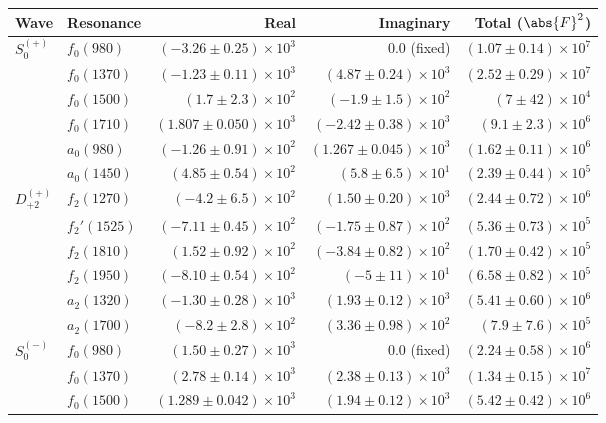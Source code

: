 \begin{table}[ht]
    \begin{center}
        \begin{tabular}{llrrr}\toprule
        Wave & Resonance & Real & Imaginary & Total ($\abs{F}^2$) \\\midrule
$S_{0}^{(+)}$ & $f_{0}(980)$ & $(-3.26 \pm 0.25) \times 10^{3}$ & $0.0$ (fixed) & $(1.07 \pm 0.14) \times 10^{7}$ \\
 & $f_{0}(1370)$ & $(-1.23 \pm 0.11) \times 10^{3}$ & $(4.87 \pm 0.24) \times 10^{3}$ & $(2.52 \pm 0.29) \times 10^{7}$ \\
 & $f_{0}(1500)$ & $(1.7 \pm 2.3) \times 10^{2}$ & $(-1.9 \pm 1.5) \times 10^{2}$ & $(7 \pm 42) \times 10^{4}$ \\
 & $f_{0}(1710)$ & $(1.807 \pm 0.050) \times 10^{3}$ & $(-2.42 \pm 0.38) \times 10^{3}$ & $(9.1 \pm 2.3) \times 10^{6}$ \\
 & $a_{0}(980)$ & $(-1.26 \pm 0.91) \times 10^{2}$ & $(1.267 \pm 0.045) \times 10^{3}$ & $(1.62 \pm 0.11) \times 10^{6}$ \\
 & $a_{0}(1450)$ & $(4.85 \pm 0.54) \times 10^{2}$ & $(5.8 \pm 6.5) \times 10^{1}$ & $(2.39 \pm 0.44) \times 10^{5}$ \\
$D_{+2}^{(+)}$ & $f_{2}(1270)$ & $(-4.2 \pm 6.5) \times 10^{2}$ & $(1.50 \pm 0.20) \times 10^{3}$ & $(2.44 \pm 0.72) \times 10^{6}$ \\
 & $f_{2}'(1525)$ & $(-7.11 \pm 0.45) \times 10^{2}$ & $(-1.75 \pm 0.87) \times 10^{2}$ & $(5.36 \pm 0.73) \times 10^{5}$ \\
 & $f_{2}(1810)$ & $(1.52 \pm 0.92) \times 10^{2}$ & $(-3.84 \pm 0.82) \times 10^{2}$ & $(1.70 \pm 0.42) \times 10^{5}$ \\
 & $f_{2}(1950)$ & $(-8.10 \pm 0.54) \times 10^{2}$ & $(-5 \pm 11) \times 10^{1}$ & $(6.58 \pm 0.82) \times 10^{5}$ \\
 & $a_{2}(1320)$ & $(-1.30 \pm 0.28) \times 10^{3}$ & $(1.93 \pm 0.12) \times 10^{3}$ & $(5.41 \pm 0.60) \times 10^{6}$ \\
 & $a_{2}(1700)$ & $(-8.2 \pm 2.8) \times 10^{2}$ & $(3.36 \pm 0.98) \times 10^{2}$ & $(7.9 \pm 7.6) \times 10^{5}$ \\
$S_{0}^{(-)}$ & $f_{0}(980)$ & $(1.50 \pm 0.27) \times 10^{3}$ & $0.0$ (fixed) & $(2.24 \pm 0.58) \times 10^{6}$ \\
 & $f_{0}(1370)$ & $(2.78 \pm 0.14) \times 10^{3}$ & $(2.38 \pm 0.13) \times 10^{3}$ & $(1.34 \pm 0.15) \times 10^{7}$ \\
 & $f_{0}(1500)$ & $(1.289 \pm 0.042) \times 10^{3}$ & $(1.94 \pm 0.12) \times 10^{3}$ & $(5.42 \pm 0.42) \times 10^{6}$ \\

\end{tabular}
\end{center}
\end{table}
